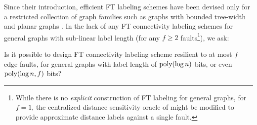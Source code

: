 Since their introduction, efficient FT labeling schemes have been devised only for a restricted collection of graph families such as graphs with bounded tree-width and planar graphs \cite{CourcelleT07,AbrahamCGP16}. In the lack of any FT connectivity labeling schemes for general graphs with sub-linear label length (for any $f\geq 2$ faults\footnote{While there is no \emph{explicit} construction of FT labeling for general graphs, for $f=1$, the centralized distance sensitivity oracle of \cite{khanna2010approximate} might be modified to provide approximate distance labels against a single fault.}), we ask:

\begin{question}\label{q:label}
Is it possible to design FT connectivity labeling scheme resilient to at most $f$ edge faults, for general graphs with label length of $\operatorname{\text{{\rm poly}}}(\log n)$ bits, or even $\operatorname{\text{{\rm poly}}}(\log n,f)$ bits? 
\end{question}

